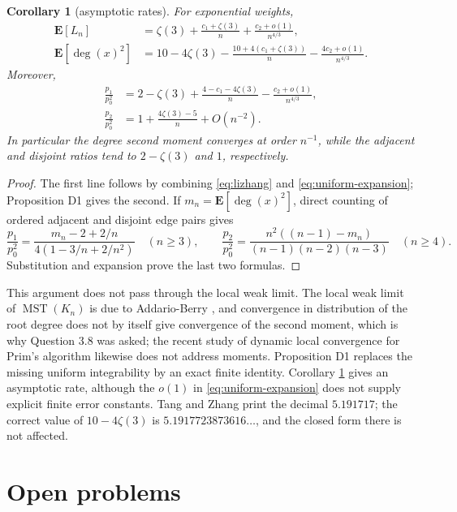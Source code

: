 \documentclass[10pt,a4paper]{amsart}
\newtheorem{corollary}[theorem]{Corollary}
\newcommand{\MST}{\operatorname{MST}}
\newcommand{\E}{\mathbf{E}}
\DeclareMathOperator{\dg}{deg}
\begin{document}
\begin{corollary}[asymptotic rates]
\label{cor:rates}
For exponential weights,
\begin{align*}
\E[L_n]
&=\zeta(3)+\frac{c_1+\zeta(3)}n+\frac{c_2+o(1)}{n^{4/3}},\\
\E[\dg(x)^2]
&=10-4\zeta(3)-\frac{10+4(c_1+\zeta(3))}{n}
-\frac{4c_2+o(1)}{n^{4/3}}.
\end{align*}
Moreover,
\begin{align*}
\frac{p_1}{p_0^2}
&=2-\zeta(3)+\frac{4-c_1-4\zeta(3)}n
-\frac{c_2+o(1)}{n^{4/3}},\\
\frac{p_2}{p_0^2}
&=1+\frac{4\zeta(3)-5}{n}+O(n^{-2}).
\end{align*}
In particular the degree second moment converges at order $n^{-1}$, while the
adjacent and disjoint ratios tend to $2-\zeta(3)$ and $1$, respectively.
\end{corollary}

\begin{proof}
The first line follows by combining \eqref{eq:lizhang} and
\eqref{eq:uniform-expansion}; Proposition D1 gives the second. If
$m_n=\E[\dg(x)^2]$, direct counting of ordered adjacent and disjoint edge pairs
gives
\[
\frac{p_1}{p_0^2}
=\frac{m_n-2+2/n}{4(1-3/n+2/n^2)}\quad(n\ge3),\qquad
\frac{p_2}{p_0^2}
=\frac{n^2((n-1)-m_n)}{(n-1)(n-2)(n-3)}\quad(n\ge4).
\]
Substitution and expansion prove the last two formulas.
\end{proof}


This argument does not pass through the local weak limit. The local weak limit
of $\MST(K_n)$ is due to Addario-Berry
\cite{ABerry}, and convergence in distribution of the root degree does not by
itself give convergence of the second moment, which is why Question 3.8 was
asked; the recent study of dynamic local convergence for Prim's algorithm
\cite{CGH} likewise does not address moments. Proposition D1 replaces the
missing uniform integrability by an exact finite identity. Corollary
\ref{cor:rates} gives an asymptotic rate, although the $o(1)$ in
\eqref{eq:uniform-expansion} does not supply explicit finite error constants.
Tang and Zhang \cite[Proposition 3.11]{TZ}
print the decimal $5.191717$; the correct value of $10-4\zeta(3)$ is
$5.1917723873616\dots$, and the closed form there is not affected.

\section{Open problems}
\label{sec:open}
\end{document}
